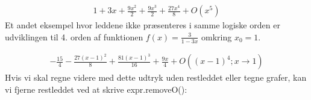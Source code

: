 \documentclass[letterpaper,10pt,english]{jupyterBook}
\begin{document}
\begin{sphinxVerbatim}[commandchars=\\\{\}]
                      
      
                   
\end{sphinxVerbatim}
\begin{equation*}
\begin{split}\displaystyle 1 + 3 x + \frac{9 x^{2}}{2} + \frac{9 x^{3}}{2} + \frac{27 x^{4}}{8} + O\left(x^{5}\right)\end{split}
\end{equation*}
Et andet eksempel hvor leddene ikke præsenteres i samme logiske orden er udviklingen til 4. orden af funktionen \(f(x) = \frac{3}{1-3x}\) omkring \(x_0 = 1\).

\begin{sphinxVerbatim}[commandchars=\\\{\}]
                           
        
                     
\end{sphinxVerbatim}
\begin{equation*}
\begin{split}\displaystyle - \frac{15}{4} - \frac{27 \left(x - 1\right)^{2}}{8} + \frac{81 \left(x - 1\right)^{3}}{16} + \frac{9 x}{4} + O\left(\left(x - 1\right)^{4}; x\rightarrow 1\right)\end{split}
\end{equation*}
Hvis vi skal regne videre med dette udtryk uden restleddet eller tegne grafer, kan vi fjerne restleddet ved at skrive expr.removeO():
\end{document}
